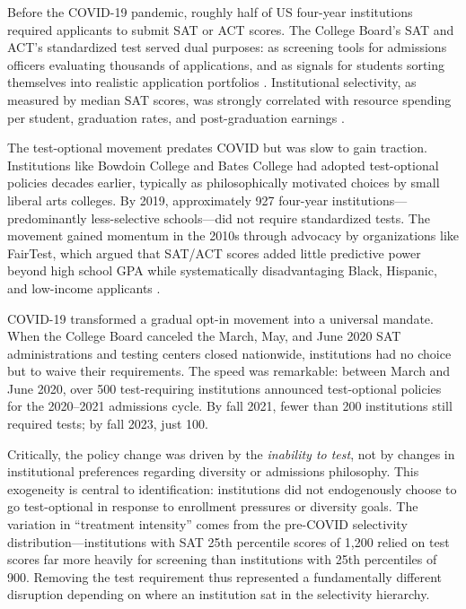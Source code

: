 \documentclass[12pt]{article}
\begin{document}
Before the COVID-19 pandemic, roughly half of US four-year institutions required applicants to submit SAT or ACT scores. The College Board's SAT and ACT's standardized test served dual purposes: as screening tools for admissions officers evaluating thousands of applications, and as signals for students sorting themselves into realistic application portfolios \citep{Hoxby2009Changing}. Institutional selectivity, as measured by median SAT scores, was strongly correlated with resource spending per student, graduation rates, and post-graduation earnings \citep{Chetty2020Income}.

The test-optional movement predates COVID but was slow to gain traction. Institutions like Bowdoin College and Bates College had adopted test-optional policies decades earlier, typically as philosophically motivated choices by small liberal arts colleges. By 2019, approximately 927 four-year institutions---predominantly less-selective schools---did not require standardized tests. The movement gained momentum in the 2010s through advocacy by organizations like FairTest, which argued that SAT/ACT scores added little predictive power beyond high school GPA while systematically disadvantaging Black, Hispanic, and low-income applicants \citep{Rosner2003,Zwick2004}.

COVID-19 transformed a gradual opt-in movement into a universal mandate. When the College Board canceled the March, May, and June 2020 SAT administrations and testing centers closed nationwide, institutions had no choice but to waive their requirements. The speed was remarkable: between March and June 2020, over 500 test-requiring institutions announced test-optional policies for the 2020--2021 admissions cycle. By fall 2021, fewer than 200 institutions still required tests; by fall 2023, just 100.

Critically, the policy change was driven by the \textit{inability to test}, not by changes in institutional preferences regarding diversity or admissions philosophy. This exogeneity is central to identification: institutions did not endogenously choose to go test-optional in response to enrollment pressures or diversity goals. The variation in ``treatment intensity'' comes from the pre-COVID selectivity distribution---institutions with SAT 25th percentile scores of 1,200 relied on test scores far more heavily for screening than institutions with 25th percentiles of 900. Removing the test requirement thus represented a fundamentally different disruption depending on where an institution sat in the selectivity hierarchy.
\end{document}
